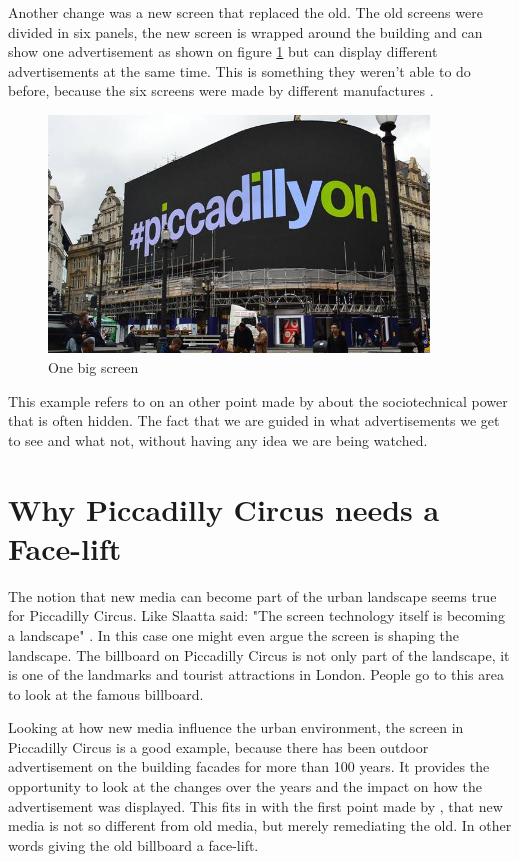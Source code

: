 \documentclass[a4paper, 11pt]{article}
\begin{document}
Another change was a new screen that replaced the old. The old screens were divided in six panels, the new screen is wrapped around the building and can show one advertisement as shown on figure \ref{fig:graph3} but can display different advertisements at the same time. This is something they weren't able to do before, because the six screens were made by different manufactures \citep{wired}.

\begin{figure}[h!]
    \centering
    \includegraphics[width=0.9\textwidth]{on.png}
    \caption{One big screen \citep{wired}}
    \label{fig:graph3}
\end{figure}

This example refers to on an other point made by \cite{Graham} about the sociotechnical power that is often hidden. The fact that we are guided in what advertisements we get to see and what not, without having any idea we are being watched.



\section{Why Piccadilly Circus needs a Face-lift}

The notion that new media can become part of the urban landscape seems true for Piccadilly Circus. Like Slaatta said: "The screen technology itself is becoming a landscape" \citep{Slaatta2006}. In this case one might even argue the screen is shaping the landscape. The billboard on Piccadilly Circus is not only part of the landscape, it is one of the landmarks and tourist attractions in London. People go to this area to look at the famous billboard. 

Looking at how new media influence the urban environment, the screen in Piccadilly Circus is a good example, because there has been outdoor advertisement on the building facades for more than 100 years. It provides the opportunity to look at the changes over the years and the impact on how the advertisement was displayed. This fits in with the first point made by \cite{Graham}, that new media is not so different from old media, but merely remediating the old. In other words giving the old billboard a face-lift. 
\end{document}

